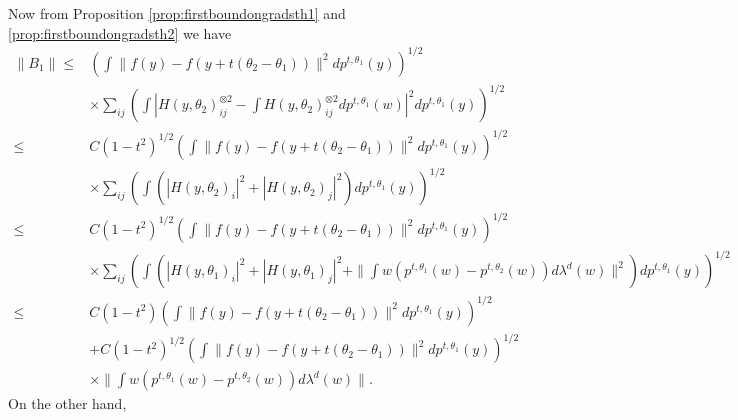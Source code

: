 \documentclass{article}
\begin{document}
Now from Proposition \ref{prop:firstboundongradsth1} and \ref{prop:firstboundongradsth2} we have
\begin{align}\label{align:B1}
    \|B_1\|  
     \leq& \left(\int \|f(y)-f(y+t(\theta_2-\theta_1))\|^2dp^{t,\theta_1}(y)\right)^{1/2}\nonumber\\
     & \times \sum_{ij}\left(\int|H(y,\theta_2)_{ij}^{\otimes2}-\int H(y,\theta_2)_{ij}^{\otimes2} dp^{t,\theta_1}(w)|^2dp^{t,\theta_1}(y)\right)^{1/2}\nonumber\\
     \leq& C (1-t^2)^{1/2}\left(\int \|f(y)-f(y+t(\theta_2-\theta_1))\|^2dp^{t,\theta_1}(y)\right)^{1/2}\nonumber\\
     & \times \sum_{ij}\left(\int(|H(y,\theta_2)_i|^2+|H(y,\theta_2)_j|^2)dp^{t,\theta_1}(y)\right)^{1/2}\nonumber\\
     \leq& C (1-t^2)^{1/2}\left(\int \|f(y)-f(y+t(\theta_2-\theta_1))\|^2dp^{t,\theta_1}(y)\right)^{1/2}\nonumber\\
     & \times \sum_{ij}\left(\int(|H(y,\theta_1)_i|^2+|H(y,\theta_1)_j|^2+\|\int w (p^{t,\theta_1}(w)-p^{t,\theta_2}(w))d\lambda^d(w)\|^2)dp^{t,\theta_1}(y)\right)^{1/2}\nonumber\\
     \leq& C (1-t^2)\left(\int \|f(y)-f(y+t(\theta_2-\theta_1))\|^2dp^{t,\theta_1}(y)\right)^{1/2}\nonumber\\
     &+ C (1-t^2)^{1/2}\left(\int \|f(y)-f(y+t(\theta_2-\theta_1))\|^2dp^{t,\theta_1}(y)\right)^{1/2}\nonumber\\
     &\times \|\int w (p^{t,\theta_1}(w)-p^{t,\theta_2}(w))d\lambda^d(w)\|.
\end{align}
On the other hand,
\end{document}
